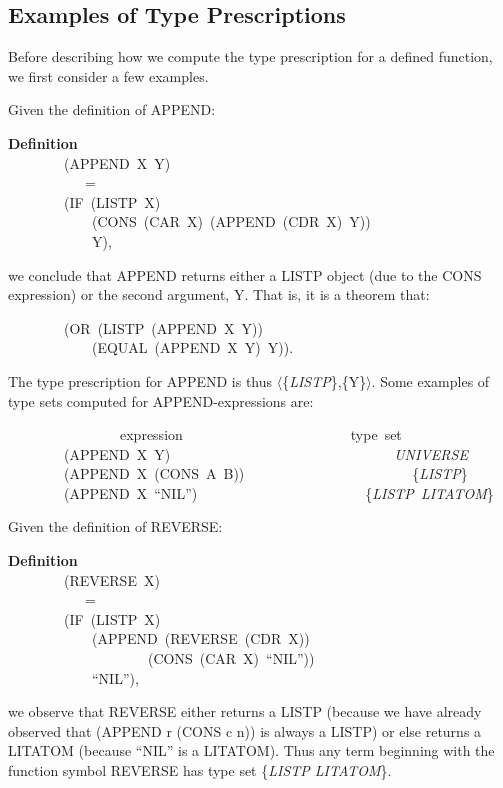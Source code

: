 \documentclass[10pt]{book}
\newenvironment{pubasis}{\begin{flushleft}}{\end{flushleft}}
\newcommand{\axiomordefinition}[1]{\vspace{6pt}\Large\textsf{\textbf{#1}}\normalsize}
\begin{document}
\subsection{Examples of Type Prescriptions}
Before describing how we compute the type prescription
for a defined function, we first consider a few examples.

Given the definition of APPEND:
\begin{pubasis}
\axiomordefinition{Definition}\\
~~~~~~~~(APPEND~X~Y)\\
~~~~~~~~~~~=\\
~~~~~~~~(IF~(LISTP~X)\\
~~~~~~~~~~~~(CONS~(CAR~X)~(APPEND~(CDR~X)~Y))\\
~~~~~~~~~~~~Y),\\
\end{pubasis}
we conclude that APPEND returns either
a LISTP object (due to the CONS expression) or the second argument, Y.
That is, it is a theorem that:
\begin{pubasis}
~~~~~~~~(OR~(LISTP~(APPEND~X~Y))\\
~~~~~~~~~~~~(EQUAL~(APPEND~X~Y)~Y)).\\
\end{pubasis}
The type prescription for APPEND is thus $\langle$\{\emph{LISTP}\},\{Y\}$\rangle$.
Some examples of type sets computed for APPEND-expressions
are:
\begin{pubasis}
~~~~~~~~~~~~~~~~expression~~~~~~~~~~~~~~~~~~~~~~~~type~set\\

~~~~~~~~(APPEND~X~Y)~~~~~~~~~~~~~~~~~~~~~~~~~~~~~~~~\emph{UNIVERSE}\\
~~~~~~~~(APPEND~X~(CONS~A~B))~~~~~~~~~~~~~~~~~~~~~~~~\{\emph{LISTP}\}\\
~~~~~~~~(APPEND~X~``NIL'')~~~~~~~~~~~~~~~~~~~~~~~~\{\emph{LISTP~LITATOM}\}\\
\end{pubasis}
Given the definition of REVERSE:
\begin{pubasis}
\axiomordefinition{Definition}\\
~~~~~~~~(REVERSE~X)\\
~~~~~~~~~~~=\\
~~~~~~~~(IF~(LISTP~X)\\
~~~~~~~~~~~~(APPEND~(REVERSE~(CDR~X))\\
~~~~~~~~~~~~~~~~~~~~(CONS~(CAR~X)~``NIL''))\\
~~~~~~~~~~~~``NIL''),\\
\end{pubasis}
we observe that REVERSE either returns a LISTP (because
we have already observed that (APPEND r (CONS c n)) is always a LISTP) or else
returns a LITATOM (because ``NIL'' is a LITATOM).  Thus any term
beginning with the function symbol REVERSE has type set \{\emph{LISTP LITATOM}\}.
\end{document}
